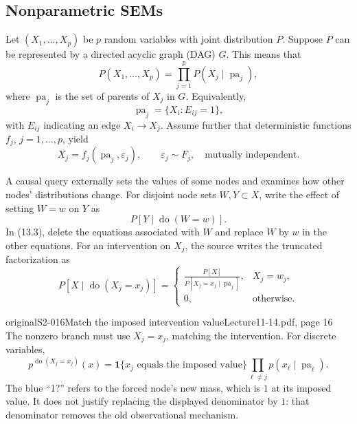 \subsection{Nonparametric SEMs}
Let $(X_1,\ldots,X_p)$ be $p$ random variables with joint distribution $P$. Suppose $P$ can be represented by a directed acyclic graph (DAG) $G$. This means that
\[
 P(X_1,\ldots,X_p)=\prod_{j=1}^p P(X_j\mid\operatorname{pa}_j),\tag{13.2}
\]
where $\operatorname{pa}_j$ is the set of parents of $X_j$ in $G$. Equivalently,
\[
 \operatorname{pa}_j=\{X_i:E_{ij}=1\},
\]
with $E_{ij}$ indicating an edge $X_i\to X_j$. Assume further that deterministic functions $f_j$, $j=1,\ldots,p$, yield
\[
 X_j=f_j(\operatorname{pa}_j,\varepsilon_j),\qquad
 \varepsilon_j\sim F_j,\quad\text{mutually independent}.\tag{13.3}
\]

A causal query externally sets the values of some nodes and examines how other nodes' distributions change. For disjoint node sets $W,Y\subset X$, write the effect of setting $W=w$ on $Y$ as
\[
 P[Y\mid\operatorname{do}(W=w)].
\]
In (13.3), delete the equations associated with $W$ and replace $W$ by $w$ in the other equations. For an intervention on $X_j$, the source writes the truncated factorization as
\[
 P[X\mid\operatorname{do}(X_j=x_j)]
 =\begin{cases}
 \displaystyle\frac{P[X]}{P[X_j=x_j\mid\operatorname{pa}_j]},&X_j=w_j,\\
 0,&\text{otherwise}.
 \end{cases}
\]

\begin{reviewnote}{original}{S2-016}{Match the imposed intervention value}{Lecture11-14.pdf, page 16}
The nonzero branch must use $X_j=x_j$, matching the intervention. For discrete variables,
\[
 p^{\operatorname{do}(X_j=x_j)}(x)
 =\mathbf1\{x_j\text{ equals the imposed value}\}\prod_{\ell\ne j}p(x_\ell\mid\operatorname{pa}_\ell).
\]
The blue ``1?'' refers to the forced node's new mass, which is $1$ at its imposed value. It does not justify replacing the displayed denominator by $1$: that denominator removes the old observational mechanism.
\end{reviewnote}

